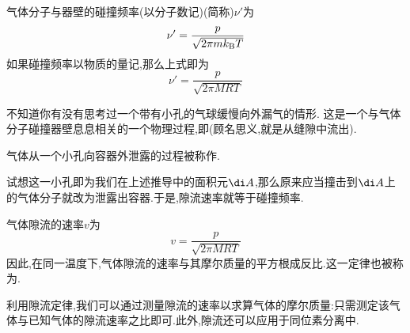 \documentclass{ctexart}
\begin{document}
\begin{theorem}[1B.4.4 气体分子与器壁的碰撞频率]
    气体分子与器壁的碰撞频率(以分子数记)(简称)$\nu'$为
    \[\nu'=\dfrac{p}{\sqrt{2\pi mk_\text BT}}\]
    如果碰撞频率以物质的量记,那么上式即为
    \[\nu'=\dfrac{p}{\sqrt{2\pi MRT}}\]
\end{theorem}
不知道你有没有思考过一个带有小孔的气球缓慢向外漏气的情形.%
这是一个与气体分子碰撞器壁息息相关的一个物理过程,即(顾名思义,就是从缝隙中流出).
\begin{definition}[1B.4.5 隙流]
    气体从一个小孔向容器外泄露的过程被称作.
\end{definition}
试想这一小孔即为我们在上述推导中的面积元$\di A$,那么原来应当撞击到$\di A$上的气体分子就改为泄露出容器.于是,隙流速率就等于碰撞频率.
\begin{theorem}
    气体隙流的速率$v$为
    \[v=\dfrac{p}{\sqrt{2\pi MRT}}\]
    因此,在同一温度下,气体隙流的速率与其摩尔质量的平方根成反比.这一定律也被称为.
\end{theorem}
利用隙流定律,我们可以通过测量隙流的速率以求算气体的摩尔质量:只需测定该气体与已知气体的隙流速率之比即可.此外,隙流还可以应用于同位素分离中.
\end{document}
